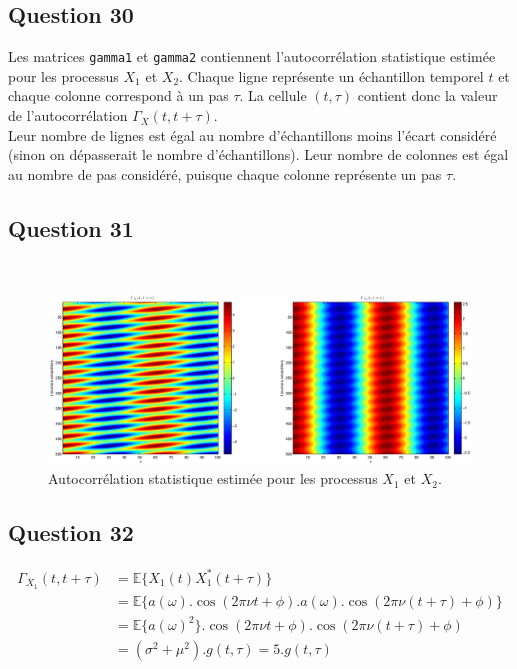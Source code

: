 \documentclass{article}
\begin{document}
\subsection*{Question 30}
Les matrices \texttt{gamma1} et \texttt{gamma2} contiennent l'autocorrélation statistique estimée pour les processus $X_1$ et $X_2$. Chaque ligne représente un échantillon temporel $t$ et chaque colonne correspond à un pas $\tau$. La cellule $(t,\tau)$ contient donc la valeur de l'autocorrélation $\Gamma_X(t,t+\tau)$. \\
Leur nombre de lignes est égal au nombre d'échantillons moins l'écart considéré (sinon on dépasserait le nombre d'échantillons). Leur nombre de colonnes est égal au nombre de pas considéré, puisque chaque colonne représente un pas $\tau$.

\newpage
\subsection*{Question 31}
 ~ 
\begin{figure}[!h]
\hspace*{-2cm}
\includegraphics[width=18cm]{q31_bis.eps}
\caption{Autocorrélation statistique estimée pour les processus $X_1$ et $X_2$.}
\label{fig:autocorrstat}
\end{figure}

\subsection*{Question 32}

\begin{equation}
\begin{aligned}
\Gamma_{X_1}(t,t+\tau)
& = \mathbb{E}\{X_1(t)X_1^*(t+\tau)\} \\
& = \mathbb{E}\{a(\omega).\cos(2\pi\nu t + \phi).a(\omega).\cos(2\pi\nu(t+\tau) + \phi)\} \\
& = \mathbb{E}\{a(\omega)^2\}.\cos(2\pi\nu t + \phi).\cos(2\pi\nu(t+\tau) + \phi) \\
& = (\sigma^2 + \mu^2).g(t,\tau) = 5.g(t,\tau)
\end{aligned}
\end{equation}
\end{document}
